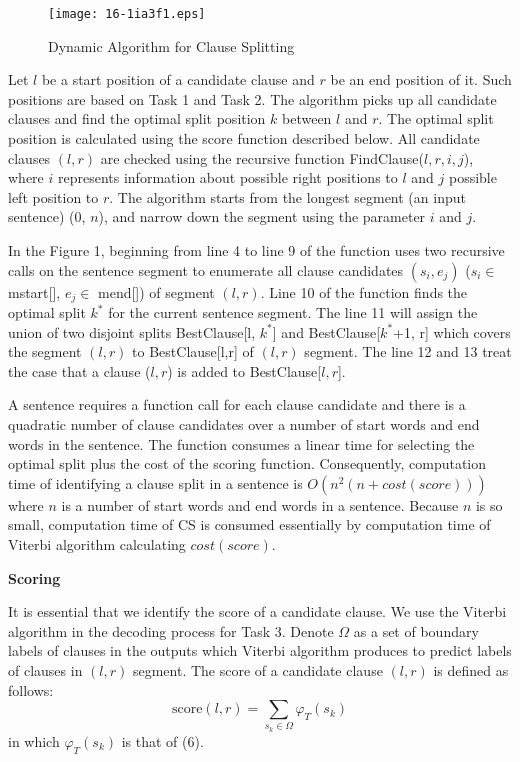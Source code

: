 \documentclass[english]{jnlp_1.4}
\begin{document}
{\begin{figure}[t]
\begin{center}
\texttt{[image: 16-1ia3f1.eps]}
\end{center}
\caption{Dynamic Algorithm for Clause Splitting}
\label{tab:algorithm}
\end{figure}

Let $l$ be a start position of a candidate clause and $r$ be an
end position of it. Such positions are based on Task 1 and Task 2.
The algorithm picks up all candidate clauses and find the optimal
split position $k$ between $l$ and $r$. The optimal split position
is calculated using the score function described below. All
candidate clauses $(l, r)$ are checked using the recursive
function FindClause($l, r, i, j$), where $i$ represents
information about possible right positions to $l$ and $j$ possible
left position to $r$. The algorithm starts from the longest
segment (an input sentence) (0, $n$), and narrow down the segment
using the parameter $i$ and $j$.

In the Figure 1, beginning from line 4 to line 9 of the function
uses two recursive calls on the sentence segment to enumerate all
clause candidates $(s_i,e_j)$ ($s_i \in $ mstart[], $e_j \in $
mend[]) of segment $(l,r)$. Line 10 of the function finds the
optimal split $k^*$ for the current sentence segment. The line 11
will assign the union of two disjoint splits BestClause[l, $k^*$]
and BestClause[$k^*$+1, r] which covers the segment $(l,r)$ to
BestClause[l,r] of $(l,r)$ segment. The line 12 and 13 treat the
case that a clause ($l,r$) is added to BestClause[$l, r$].

A sentence requires a function call for each clause candidate and
there is a quadratic number of clause candidates over a number of
start words and end words in the sentence. The function consumes a
linear time for selecting the optimal split plus the cost of the
scoring function. Consequently, computation time of identifying a
clause split in a sentence is $O(n^2( n + cost(score)))$ where $n$
is a number of start words and end words in a sentence. Because
$n$ is so small, computation time of CS is consumed essentially by
computation time of Viterbi algorithm calculating $cost(score)$.


{\bf \noindent Scoring}

It is essential that we identify the score of a candidate clause.
We use the Viterbi algorithm in the decoding process for Task 3.
Denote $\Omega$ as a set of boundary labels of clauses in the
outputs which Viterbi algorithm produces to predict labels of
clauses in $(l,r)$ segment. The score of a candidate clause
$(l,r)$ is defined as follows:
\begin{equation}
\mathrm {score}(l,r) = \sum_{s_k \in \Omega}{\varphi}_{T}(s_k)
\end{equation}
in which $\varphi_{T}(s_k)$ is that of (6).

}
\end{document}
